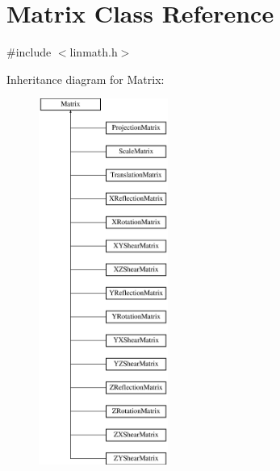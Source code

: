 \hypertarget{a00111}{\section{Matrix Class Reference}
\label{a00111}
}


{\ttfamily \#include $<$linmath.\-h$>$}

Inheritance diagram for Matrix\-:\begin{figure}[H]
\begin{center}
\leavevmode
\includegraphics[height=12.000000cm]{a00111}
\end{center}
\end{figure}
